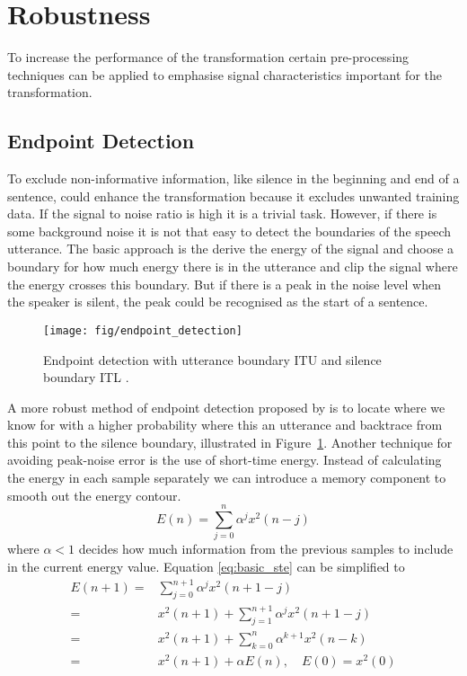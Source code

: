 
\section{Robustness} %
\label{sec:robustness}
To increase the performance of the transformation certain pre-processing techniques can be applied to emphasise signal characteristics important for the transformation.

\subsection{Endpoint Detection} %
\label{sub:endpoint_detection}
To exclude non-informative information, like silence in the beginning and end of a sentence, could enhance the transformation because it excludes unwanted training data. If the signal to noise ratio is high it is a trivial task. However, if there is some background noise it is not that easy to detect the boundaries of the speech utterance. The basic approach is the derive the energy of the signal and choose a boundary for how much energy there is in the utterance and clip the signal where the energy crosses this boundary. But if there is a peak in the noise level when the speaker is silent, the peak could be recognised as the start of a sentence.

\begin{figure}[htbp]
	\begin{center}
		\texttt{[image: fig/endpoint\_detection]}
		\caption{Endpoint detection with utterance boundary ITU and silence boundary ITL \cite{rabiner75}.}
		\label{fig:endpoint_detection}
	\end{center}
\end{figure}

A more robust method of endpoint detection proposed by \cite{rabiner75} is to locate where we know for with a higher probability where this an utterance and backtrace from this point to the silence boundary, illustrated in Figure~\ref{fig:endpoint_detection}. Another technique for avoiding peak-noise error is the use of short-time energy. Instead of calculating the energy in each sample separately we can introduce a memory component to smooth out the energy contour.
\begin{equation}
	E(n)=\sum_{j=0}^{n}\alpha^j x^2(n-j)
	\label{eq:basic_ste}
\end{equation}
where $\alpha < 1$ decides how much information from the previous samples to include in the current energy value. Equation \eqref{eq:basic_ste} can be simplified to
\begin{equation}
	\begin{split}
		E(n+1)=& \sum_{j=0}^{n+1}\alpha^jx^2(n+1-j)\\
		=& x^2(n+1)+\sum_{j=1}^{n+1}\alpha^jx^2(n+1-j)\\
		=& x^2(n+1)+\sum_{k=0}^{n}\alpha^{k+1} x^2(n-k)\\
		=& x^2(n+1)+\alpha E(n), \quad E(0)=x^2(0)\\
	\end{split}
	\label{eq:short_time_energy}
\end{equation}

